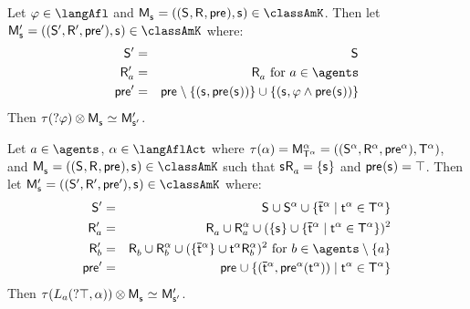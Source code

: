 \begin{lemma}\label{afl-s-construction-test}
Let $\phi \in \langAfl$ and $\aPModel{\aStateS} = \aPModelTuple{\aStateS} \in \classAmK$.
Then let $\aPModel[\prime]{\aStateS} = \aPModelTuple[\prime]{\aStateS} \in \classAmK$ where:
\begin{eqnarray*}
    \aStates[\prime] &=& \aStates\\
    \aAccessibility[\prime]{\agentA} &=& \aAccessibility{\agentA} \text{ for } \agentA \in \agents\\
    \aPrecondition[\prime] &=& \aPrecondition \setminus \{(\aStateS, \aPrecondition(\aStateS))\} \cup \{(\aStateS, \phi \land \aPrecondition(\aStateS))\}
\end{eqnarray*}
Then $\tau(\test{\phi}) \exec \aPModel{\aStateS} \bisimilar \aPModel[\prime]{\aStateS[\prime]}$.
\end{lemma}

\begin{lemma}\label{afl-s-construction-learning}
Let $\agentA \in \agents$, $\alpha \in \langAflAct$ where $\tau(\alpha) = \aPModel[\alpha]{\aStatesT[\alpha]} = \aPModelTuple[\alpha]{\aStatesT[\alpha]}$, and $\aPModel{\aStateS} = \aPModelTuple{\aStateS} \in \classAmK$ such that $\aStateS \aAccessibility{\agentA} = \{\aStateS\}$ and $\aPrecondition(\aStateS) = \top$.
Then let $\aPModel[\prime]{\aStateS} = \aPModelTuple[\prime]{\aStateS} \in \classAmK$ where:
\begin{eqnarray*}
    \aStates[\prime] &=& \aStates \cup \aStates[\alpha] \cup \{\aPStateT[\alpha] \mid \aStateT[\alpha] \in \aStatesT[\alpha]\}\\
    \aAccessibility[\prime]{\agentA} &=& \aAccessibility{\agentA} \cup \aAccessibility[\alpha]{\agentA} \cup (\{\aStateS\} \cup \{\aPStateT[\alpha] \mid \aStateT[\alpha] \in \aStatesT[\alpha]\})^2\\
    \aAccessibility[\prime]{\agentB} &=& \aAccessibility{\agentB} \cup \aAccessibility[\alpha]{\agentB} \cup (\{\aPStateT[\alpha]\} \cup \aStateT[\alpha] \aAccessibility[\alpha]{\agentB})^2 \text{ for } \agentB \in \agents \setminus \{\agentA\}\\
    \aPrecondition[\prime] &=& \aPrecondition \cup \{(\aPStateT[\alpha], \aPrecondition[\alpha](\aStateT[\alpha])) \mid \aStateT[\alpha] \in \aStatesT[\alpha]\}
\end{eqnarray*}
Then $\tau(\learns_\agentA (\test{\top}, \alpha)) \exec \aPModel{\aStateS} \bisimilar \aPModel[\prime]{\aStateS[\prime]}$.
\end{lemma}

